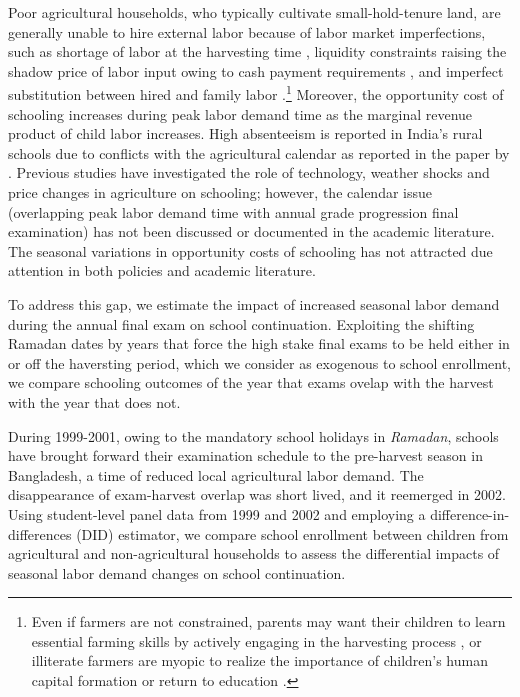 \documentclass[12pt,letterpaper]{article}\usepackage[margin=1in]{geometry}
\newcommand{\0}{\ensuremath{\mbox{\boldmath $0$}}}
\begin{document}
Poor agricultural households, who typically cultivate small-hold-tenure land, are generally unable to hire external labor because of labor market imperfections, such as shortage of labor at the harvesting time \citep{rosenzweig1988labor}, liquidity constraints raising the shadow price of labor input owing to cash payment requirements \citep{singh1986agricultural}, and imperfect substitution between hired and family labor \citep{de1991peasant}.\footnote{Even if farmers are not constrained, parents may want their children to learn essential farming skills by actively engaging in the harvesting process \citep{bhalotra2003child}, or illiterate farmers are myopic to realize the importance of children's human capital formation or return to education \citep{BalandRobinson2000}. } Moreover, the opportunity cost of schooling increases during peak labor demand time as the marginal revenue product of child labor increases. High absenteeism is reported in India's rural schools due to conflicts with the agricultural calendar as reported in the paper by \cite{de2016estimating}. Previous studies have investigated the role of technology, weather shocks and price changes in agriculture on schooling; however, the calendar issue (overlapping peak labor demand time with annual grade progression final examination) has not been discussed or documented in the academic literature. The seasonal variations in opportunity costs of schooling has not attracted due attention in both policies and academic literature. 

To address this gap, we estimate the impact of increased seasonal labor demand during the annual final exam on school continuation. Exploiting the shifting Ramadan dates by years that force the high stake final exams to be held either in or off the haversting period, which we consider as exogenous to school enrollment, we compare schooling outcomes of the year that exams ovelap with the harvest with the year that does not. 

During 1999-2001, owing to the mandatory school holidays in \textit{Ramadan}, schools have brought forward their examination schedule to the pre-harvest season in Bangladesh, a time of reduced local agricultural labor demand. The disappearance of exam-harvest overlap was short lived, and it reemerged in 2002. Using student-level panel data from 1999 and 2002 and employing a difference-in-differences (DID) estimator, we compare school enrollment between children from agricultural and non-agricultural households to assess the differential impacts of seasonal labor demand changes on school continuation. 
\end{document}

